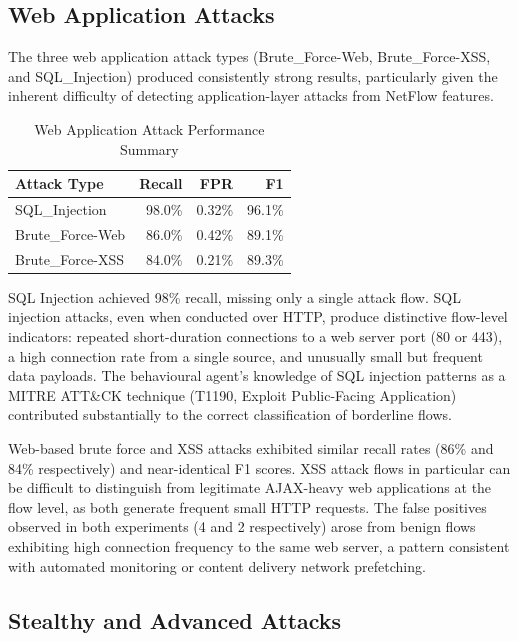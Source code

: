 \documentclass[../main.tex]{subfiles}
\begin{document}
\subsection{Web Application Attacks}
\label{sec:web-attacks}

The three web application attack types (Brute\_Force-Web, Brute\_Force-XSS, and SQL\_Injection) produced consistently strong results, particularly given the inherent difficulty of detecting application-layer attacks from NetFlow features.

\begin{table}[H]
\centering
\caption{Web Application Attack Performance Summary}
\label{tab:web-performance}
\begin{tabular}{l r r r}
\toprule
Attack Type & Recall & FPR & F1 \\
\midrule
SQL\_Injection & 98.0\% & 0.32\% & 96.1\% \\
Brute\_Force-Web & 86.0\% & 0.42\% & 89.1\% \\
Brute\_Force-XSS & 84.0\% & 0.21\% & 89.3\% \\
\bottomrule
\end{tabular}
\end{table}

SQL Injection achieved 98\% recall, missing only a single attack flow. SQL injection attacks, even when conducted over HTTP, produce distinctive flow-level indicators: repeated short-duration connections to a web server port (80 or 443), a high connection rate from a single source, and unusually small but frequent data payloads. The behavioural agent's knowledge of SQL injection patterns as a MITRE ATT\&CK technique (T1190, Exploit Public-Facing Application) contributed substantially to the correct classification of borderline flows.

Web-based brute force and XSS attacks exhibited similar recall rates (86\% and 84\% respectively) and near-identical F1 scores. XSS attack flows in particular can be difficult to distinguish from legitimate AJAX-heavy web applications at the flow level, as both generate frequent small HTTP requests. The false positives observed in both experiments (4 and 2 respectively) arose from benign flows exhibiting high connection frequency to the same web server, a pattern consistent with automated monitoring or content delivery network prefetching.

\subsection{Stealthy and Advanced Attacks}
\label{sec:stealthy-attacks}
\end{document}
